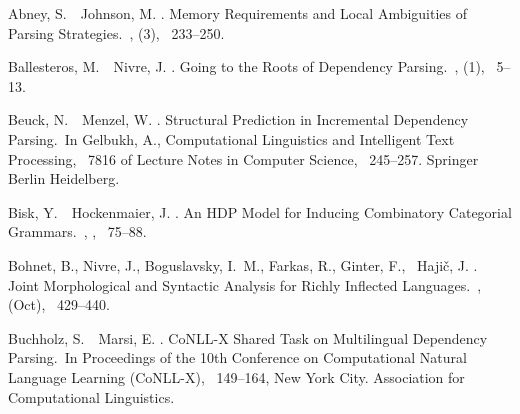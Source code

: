 \documentclass[english]{jnlp_1.4}
\begin{document}

\begin{thebibliography}{}

Abney, S.\BBACOMMA\ \BBA\ Johnson, M. \BBCP.
\newblock \BBOQ Memory Requirements and Local Ambiguities of Parsing
  Strategies.\BBCQ\
, {} (3),
  \mbox{\BPGS\ 233--250}.

Ballesteros, M.\BBACOMMA\ \BBA\ Nivre, J. \BBCP.
\newblock \BBOQ Going to the Roots of Dependency Parsing.\BBCQ\
, {}  (1), \mbox{\BPGS\
  5--13}.

Beuck, N.\BBACOMMA\ \BBA\ Menzel, W. \BBCP.
\newblock \BBOQ Structural Prediction in Incremental Dependency Parsing.\BBCQ\
\newblock In Gelbukh, A.\BED, {\Bem Computational Linguistics and Intelligent
  Text Processing}, \lowercase{\BVOL}\ 7816 of {\Bem Lecture Notes in Computer
  Science}, \mbox{\BPGS\ 245--257}. Springer Berlin Heidelberg.

Bisk, Y.\BBACOMMA\ \BBA\ Hockenmaier, J. \BBOP 2013\BBCP.
\newblock \BBOQ An {HDP} Model for Inducing Combinatory Categorial
  Grammars.\BBCQ\
\newblock {\Bem {TACL}}, {\Bbf 1}, \mbox{\BPGS\ 75--88}.

Bohnet, B., Nivre, J., Boguslavsky, I.~M., Farkas, R., Ginter, F., \BBA\
  Haji{\v{c}}, J. \BBCP.
\newblock \BBOQ Joint Morphological and Syntactic Analysis for Richly Inflected
  Languages.\BBCQ\
,
  {\Bbf 1}  (Oct), \mbox{\BPGS\ 429--440}.

Buchholz, S.\BBACOMMA\ \BBA\ Marsi, E. \BBOP 2006\BBCP.
\newblock \BBOQ CoNLL-X Shared Task on Multilingual Dependency Parsing.\BBCQ\
\newblock In {\Bem Proceedings of the 10th Conference on Computational Natural
  Language Learning (CoNLL-X)}, \mbox{\BPGS\ 149--164}, New York City.
  Association for Computational Linguistics.


\end{thebibliography}
\end{document}
